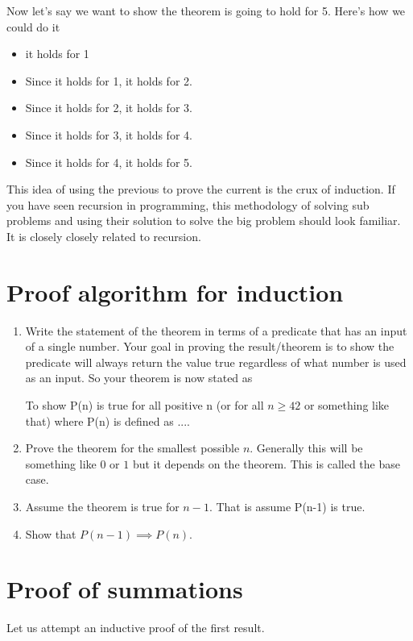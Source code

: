 \documentclass[12pt]{article}
\begin{document}
Now let's say we want to show the theorem is going to hold for 5. Here's how we could do it

\begin{itemize}
\item it holds for 1
\item Since it holds for 1, it holds for 2.
\item Since it holds for 2, it holds for 3.
\item Since it holds for 3, it holds for 4.
\item Since it holds for 4, it holds for 5.
\end{itemize}

This idea of using the previous to prove the current is the crux of induction. If you have seen recursion in programming, this methodology of solving sub problems and using their solution to solve the big problem should look familiar. It is closely closely related to recursion. 

\section*{Proof algorithm for induction}

\begin{enumerate}
\item Write the statement of the theorem in terms of a predicate that has an input of a single number.  Your goal in proving the result/theorem is to show the predicate will always return the value true regardless of what number is used as an input. So your theorem is now stated as 

To show P(n) is true for all positive n (or for all $n \ge 42$ or something like that) where P(n) is defined as ....

\item Prove the theorem for the smallest possible $n$. Generally this will be something like $0$ or $1$ but it depends on the theorem. This is called the base case.
\item Assume the theorem is true for $n-1$. That is assume P(n-1) is true.
\item Show that $P(n-1) \implies P(n)$.
\end{enumerate}

\section*{Proof of summations}

Let us attempt an inductive proof of the first result.
\end{document}
